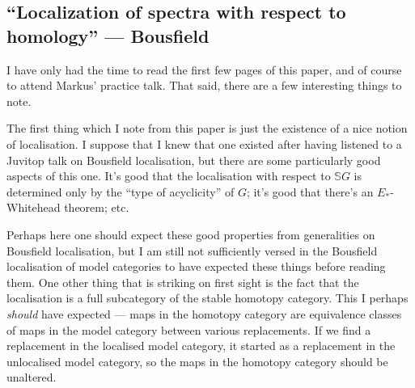 \documentclass[11pt]{article}
\newcommand{\KanSemResponse}[1]
{
\thispagestyle{fancy}
\subsection*{#1}
}
\begin{document}
\begin{BousfieldLoc}
\KanSemResponse
{``Localization of spectra with respect to homology'' --- Bousfield}
I have only had the time to read the first few pages of this paper, and of course to attend Markus' practice talk. That said, there are a few interesting things to note.

The first thing which I note from this paper is just the existence of a nice notion of localisation. I suppose that I knew that one existed after having listened to a Juvitop talk on Bousfield localisation, but there are some particularly good aspects of this one. It's good that the localisation with respect to $\mathbb{S}G$ is determined only by the ``type of acyclicity'' of $G$; it's good that there's an $E_*$-Whitehead theorem; etc.

Perhaps here one should expect these good properties from generalities on Bousfield localisation, but I am still not sufficiently versed in the Bousfield localisation of model categories to have expected these things before reading them. One other thing that is striking on first sight is the fact that the localisation is a full subcategory of the stable homotopy category. This I perhaps \emph{should} have expected --- maps in the homotopy category are equivalence classes of maps in the model category between various replacements. If we find a replacement in the localised model category, it started as a replacement in the unlocalised model category, so the maps in the homotopy category should be unaltered.


\end{BousfieldLoc}
\end{document}
